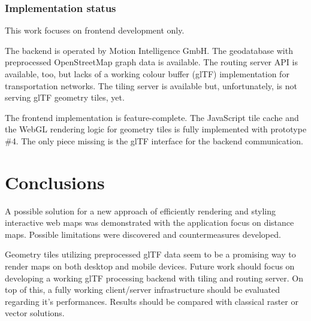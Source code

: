 \documentclass{motivation}
\begin{document}
\subsubsection{Implementation status}
  This work focuses on frontend development only.\par
  The backend is operated by Motion Intelligence GmbH. The geodatabase with preprocessed OpenStreetMap graph data is available. The routing server API is available, too, but lacks of a working colour buffer (glTF) implementation for transportation networks. The tiling server is available but, unfortunately, is not serving glTF geometry tiles, yet.\par
  The frontend implementation is feature-complete. The Java\-Script tile cache and the WebGL rendering logic for geometry tiles is fully implemented with prototype \#4. The only piece missing is the glTF interface for the backend communication.

\section{Conclusions}
  A possible solution for a new approach of efficiently rendering and styling interactive web maps was demonstrated with the application focus on distance maps. Possible limitations were discovered and countermeasures developed.\par
  Geometry tiles utilizing preprocessed glTF data seem to be a promising way to render maps on both desktop and mobile devices. Future work should focus on developing a working glTF processing backend with tiling and routing server. On top of this, a fully working client/server infrastructure should be evaluated regarding it's performances. Results should be compared with classical raster or vector solutions.

\newpage
\appendix


\end{document}
